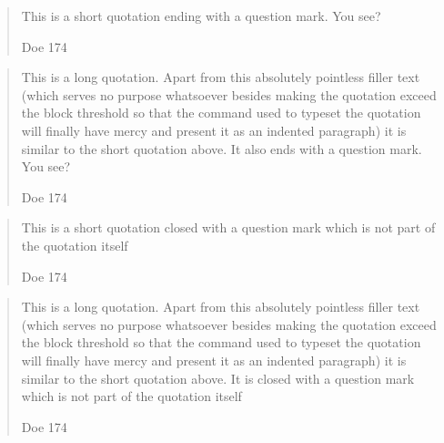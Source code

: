 \documentclass[a4paper]{article}
\newcommand*{\example}[1]{%
  \addvspace{\baselineskip}%
  \par\noindent\hspace{-4em}%
  \makebox[3em][r]{\textbf{Ex. #1}}%
  \hspace{1em}\ignorespaces}
\begin{document}
\renewcommand*{\mkmidblockpunct}[1]{%
  \ifblockquote
    {\ifquotepunct{}{.}}
    {}}

\example{2}
\blockquote[Doe 174]{This is a short quotation ending with a question
mark. You see?}

\blockquote[Doe 174]{This is a long quotation. Apart from this absolutely
pointless filler text (which serves no purpose whatsoever besides making the
quotation exceed the block threshold so that the command used to typeset the
quotation will finally have mercy and present it as an indented paragraph) it
is similar to the short quotation above. It also ends with a question mark.
You see?}

%
%
%
%

\renewcommand*{\mkmidblockpunct}[1]{%
  \ifblockquote
    {\ifstringblank{#1}
       {\ifquotepunct{}{.}}
       {}}
    {}}

\renewcommand*{\mkfinblockpunct}[1]{%
  \ifblockquote
    {\ifstringblank{#1}{}{#1}}
    {\ifstringblank{#1}{.}{#1}}}

\example{3}
\blockquote[Doe 174][?]{This is a short quotation closed with a question mark
which is not part of the quotation itself}

\blockquote[Doe 174][?]{This is a long quotation. Apart from this absolutely
pointless filler text (which serves no purpose whatsoever besides making the
quotation exceed the block threshold so that the command used to typeset the
quotation will finally have mercy and present it as an indented paragraph) it
is similar to the short quotation above. It is closed with a question mark
which is not part of the quotation itself}

\end{document}
